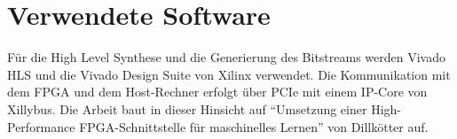 \section{Verwendete Software}
Für die High Level Synthese und die Generierung des Bitstreams werden Vivado HLS  und die Vivado Design Suite von Xilinx verwendet. Die Kommunikation mit dem FPGA und dem Host-Rechner erfolgt über PCIe mit einem IP-Core von Xillybus.\cite{XILLY} Die Arbeit baut in dieser Hinsicht auf "`Umsetzung einer High-Performance FPGA-Schnittstelle für maschinelles Lernen"' von Dillkötter\cite{DILL} auf.